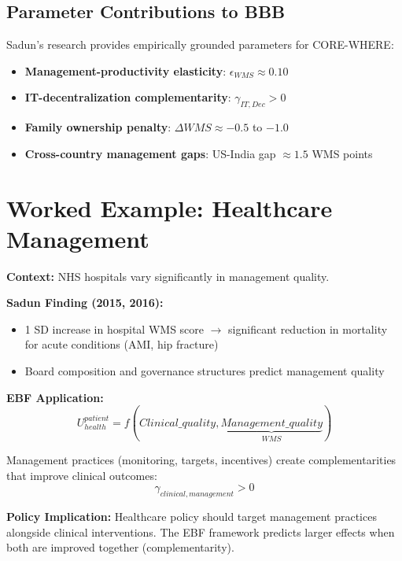 \subsection{Parameter Contributions to BBB}

Sadun's research provides empirically grounded parameters for CORE-WHERE:

\begin{itemize}
    \item \textbf{Management-productivity elasticity}: $\epsilon_{WMS} \approx 0.10$
    \item \textbf{IT-decentralization complementarity}: $\gamma_{IT,Dec} > 0$
    \item \textbf{Family ownership penalty}: $\Delta WMS \approx -0.5$ to $-1.0$
    \item \textbf{Cross-country management gaps}: US-India gap $\approx 1.5$ WMS points
\end{itemize}

\section{Worked Example: Healthcare Management}

\begin{tcolorbox}[colback=green!5!white, colframe=green!75!black,
    title=Example: Hospital Management and Patient Outcomes]

\textbf{Context:} NHS hospitals vary significantly in management quality.

\textbf{Sadun Finding (2015, 2016):}
\begin{itemize}
    \item 1 SD increase in hospital WMS score $\rightarrow$ significant reduction
    in mortality for acute conditions (AMI, hip fracture)
    \item Board composition and governance structures predict management quality
\end{itemize}

\textbf{EBF Application:}
\begin{equation}
U^{patient}_{health} = f(Clinical\_quality, \underbrace{Management\_quality}_{WMS})
\end{equation}

Management practices (monitoring, targets, incentives) create complementarities
that improve clinical outcomes:
\begin{equation}
\gamma_{clinical, management} > 0
\end{equation}

\textbf{Policy Implication:}
Healthcare policy should target management practices alongside clinical
interventions. The EBF framework predicts larger effects when both are
improved together (complementarity).

\end{tcolorbox}

